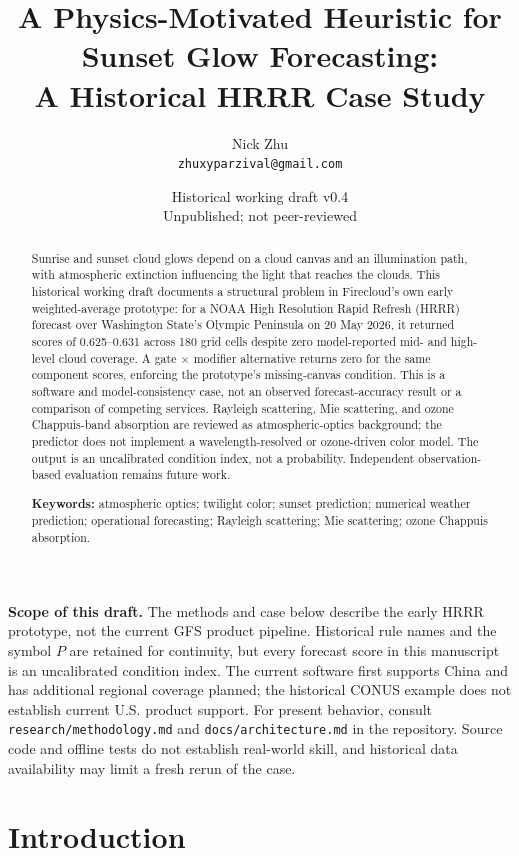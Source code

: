 \documentclass[11pt,a4paper]{article}
\title{A Physics-Motivated Heuristic for Sunset Glow Forecasting:\\
A Historical HRRR Case Study}
\author{Nick Zhu \\ \small\texttt{zhuxyparzival@gmail.com}}
\date{Historical working draft v0.4\\\small Unpublished; not peer-reviewed}
\begin{document}
\maketitle

\begin{abstract}
Sunrise and sunset cloud glows depend on a cloud canvas and an illumination path, with atmospheric extinction influencing the light that reaches the clouds. This historical working draft documents a structural problem in Firecloud's own early weighted-average prototype: for a NOAA High Resolution Rapid Refresh (HRRR) forecast over Washington State's Olympic Peninsula on 20 May 2026, it returned scores of 0.625--0.631 across 180 grid cells despite zero model-reported mid- and high-level cloud coverage. A gate $\times$ modifier alternative returns zero for the same component scores, enforcing the prototype's missing-canvas condition. This is a software and model-consistency case, not an observed forecast-accuracy result or a comparison of competing services. Rayleigh scattering, Mie scattering, and ozone Chappuis-band absorption are reviewed as atmospheric-optics background; the predictor does not implement a wavelength-resolved or ozone-driven color model. The output is an uncalibrated condition index, not a probability. Independent observation-based evaluation remains future work.

\medskip
\noindent\textbf{Keywords:} atmospheric optics; twilight color; sunset prediction; numerical weather prediction; operational forecasting; Rayleigh scattering; Mie scattering; ozone Chappuis absorption.
\end{abstract}

\noindent\textbf{Scope of this draft.} The methods and case below describe the early HRRR prototype, not the current GFS product pipeline. Historical rule names and the symbol $P$ are retained for continuity, but every forecast score in this manuscript is an uncalibrated condition index. The current software first supports China and has additional regional coverage planned; the historical CONUS example does not establish current U.S. product support. For present behavior, consult \texttt{research/methodology.md} and \texttt{docs/architecture.md} in the repository. Source code and offline tests do not establish real-world skill, and historical data availability may limit a fresh rerun of the case.

\section{Introduction}
\end{document}
